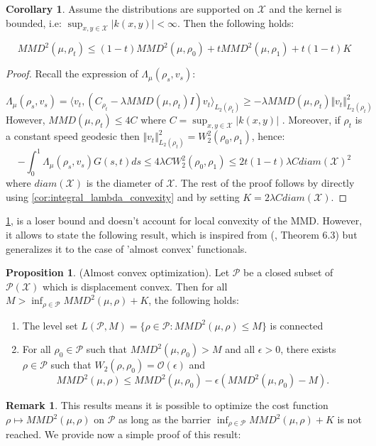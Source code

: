 \documentclass{article}
\newcommand{\1}{\mathbbm 1}
\theoremstyle{definition}
\newtheorem{corollary}[theorem]{Corollary}
\newtheorem{proposition}[theorem]{Proposition}
\newtheorem{remark}{Remark}
\begin{document}
%
\begin{corollary}
\label{cor:loser_bound}Assume the distributions are supported on
$\mathcal{X}$ and the kernel is bounded, i.e: $\sup_{x,y\in\mathcal{X}}\vert k(x,y)\vert<\infty$.
Then the following holds:

\[
MMD^{2}(\mu,\rho_{t})\leq(1-t)MMD^{2}(\mu,\rho_{0})+tMMD^{2}(\mu,\rho_{1})+t(1-t)K
\]
\end{corollary}
%
\begin{proof}
Recall the expression of $\Lambda_{\mu}(\rho_{s},v_{s}):$

\[
\Lambda_{\mu}(\rho_{s},v_{s})=\langle v_{t},(C_{\rho_{t}}-\lambda MMD(\mu,\rho_{t})I)v_{t}\rangle_{L_{2}(\rho_{t})}\geq-\lambda MMD(\mu,\rho_{t})\Vert v_{t}\Vert_{L_{2}(\rho_{t})}^{2}
\]
However, $MMD(\mu,\rho_{t})\leq4C$ where $C=\sup_{x,y\in\mathcal{X}}\vert k(x,y)\vert$
. Moreover, if $\rho_{t}$ is a constant speed geodesic then $\Vert v_{t}\Vert_{L_{2}(\rho_{t})}^{2}=W_{2}^{2}(\rho_{0},\rho_{1})$,
hence: 
\[
-\int_{0}^{1}\Lambda_{\mu}(\rho_{s},v_{s})G(s,t)ds\leq4\lambda CW_{2}^{2}(\rho_{0},\rho_{1})\leq2t(1-t)\lambda Cdiam(\mathcal{X})^{2}
\]
where $diam(\mathcal{X})$ is the diameter of $\mathcal{X}$. The
rest of the proof follows by directly using \ref{cor:integral_lambda_convexity}
and by setting $K=2\lambda Cdiam(\mathcal{X})$.
\end{proof}
%
\ref{cor:loser_bound}, is a loser bound and doesn't account for local
convexity of the MMD. However, it allows to state the following result,
which is inspired from (\cite{Bottou:2017}, Theorem 6.3) but generalizes
it to the case of 'almost convex' functionals.
\begin{proposition}

(Almost convex optimization). Let $\mathcal{P}$ be a closed subset
of $\mathcal{P}(\mathcal{X})$ which is displacement convex. Then
for all $M>\inf_{\rho\in\mathcal{P}}MMD^{2}(\mu,\rho)+K$, the following
holds:
\end{proposition}
\begin{enumerate}
\item The level set $L(\mathcal{P},M)=\{\rho\in\mathcal{P}:MMD^{2}(\mu,\rho)\leq M\}$
is connected
\item For all $\rho_{0}\in\mathcal{P}$ such that $MMD^{2}(\mu,\rho_0)>M$
and all $\epsilon>0$, there exists $\rho\in\mathcal{P}$ such that
$W_{2}(\rho,\rho_{0})=\mathcal{O}(\epsilon)$ and
\[
MMD^{2}(\mu,\rho)\leq MMD^{2}(\mu,\rho_{0})-\epsilon(MMD^{2}(\mu,\rho_{0})-M).
\]
\end{enumerate}
%
\begin{remark}
This results means it is possible to optimize the cost function $\rho\mapsto MMD^{2}(\mu,\rho)$
on $\mathcal{P}$ as long as the barrier $\inf_{\rho\in\mathcal{P}}MMD^{2}(\mu,\rho)+K$
is not reached. We provide now a simple proof of this result:
\end{remark}
\end{document}
